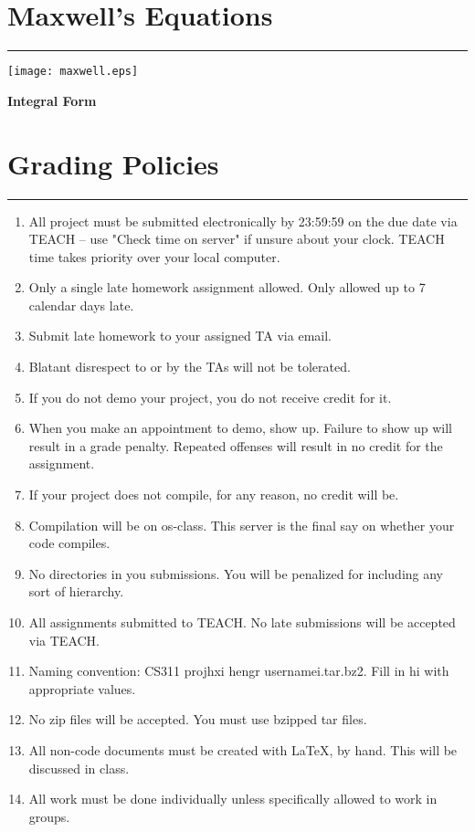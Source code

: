 \documentclass[fleqn,10pt,titlepage]{article}
\numberwithin{equation}{section}
\begin{document}
\section*{Maxwell's Equations}
\hrule
\begin{center}
\texttt{[image: maxwell.eps]}
\end{center}

{\large \textbf{Integral Form}}


\clearpage

\section*{Grading Policies}
\hrule

\begin{enumerate}
\item{All project must be submitted electronically by 23:59:59 on the due date via TEACH -- use "Check
time on server" if unsure about your clock. TEACH time takes priority over your local computer.}
\item {Only a single late homework assignment allowed. Only allowed up to 7 calendar days late.}
\item {Submit late homework to your assigned TA via email.}
\item {Blatant disrespect to or by the TAs will not be tolerated.}
\item {If you do not demo your project, you do not receive credit for it.}
\item {When you make an appointment to demo, show up. Failure to show up will result in a grade penalty.
Repeated offenses will result in no credit for the assignment.}
\item {If your project does not compile, for any reason, no credit will be.}
\item {Compilation will be on os-class. This server is the final say on whether your code compiles.}
\item {No directories in you submissions. You will be penalized for including any sort of hierarchy.}
\item {All assignments submitted to TEACH. No late submissions will be accepted via TEACH.}
\item {Naming convention: CS311 projhxi hengr usernamei.tar.bz2. Fill in hi with appropriate values.}
\item {No zip files will be accepted. You must use bzipped tar files.}
\item {All non-code documents must be created with LaTeX, by hand. This will be discussed in class.}
\item {All work must be done individually unless specifically allowed to work in groups.}
\end{enumerate}
\end{document}
